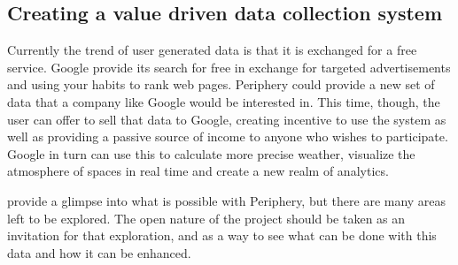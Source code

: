 \subsection{Creating a value driven data collection system}
Currently the trend of user generated data is that it is exchanged for a free service. Google provide its search for free in exchange for targeted advertisements and using your habits to rank web pages. Periphery could provide a new set of data that a company like Google would be interested in. This time, though, the user can offer to sell that data to Google, creating incentive to use the system as well as providing a passive source of income to anyone who wishes to participate. Google in turn can use this to calculate more precise weather, visualize the atmosphere of spaces in real time and create a new realm of analytics. 

 provide a glimpse into what is possible with Periphery, but there are many areas left to be explored. The open nature of the project should be taken as an invitation for that exploration, and as a way to see what can be done with this data and how it can be enhanced.
